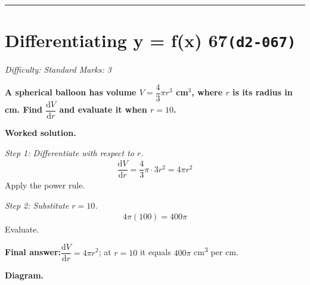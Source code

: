 \documentclass[11pt]{article}
\newcommand{\question}[1]{\par\medskip\noindent\textbf{#1}\par}
\begin{document}
\medskip\hrule

\section*{Differentiating y = f(x) 67\quad\small\texttt{(d2-067)}}
\textit{Difficulty: Standard \quad\textbar\quad Marks: 3}

\question{A spherical balloon has volume \( V = \dfrac{4}{3}\pi r^3 \) cm\( ^3 \), where \( r \) is its radius in cm. Find \( \dfrac{\mathrm{d}V}{\mathrm{d}r} \) and evaluate it when \( r = 10 \).}

\textbf{Worked solution.}

\textit{Step 1: Differentiate with respect to \( r \).}
\[\begin{gathered}
\dfrac{\mathrm{d}V}{\mathrm{d}r} = \dfrac{4}{3}\pi \cdot 3r^2 = 4\pi r^2
\end{gathered}\]
Apply the power rule.

\textit{Step 2: Substitute \( r = 10 \).}
\[\begin{gathered}
4\pi (100) = 400\pi
\end{gathered}\]
Evaluate.

\begin{answerbox}
\textbf{Final answer:}\quad \(\displaystyle  \dfrac{\mathrm{d}V}{\mathrm{d}r} = 4\pi r^2 \); at \(\displaystyle  r = 10 \) it equals \(\displaystyle  400\pi \) cm\textsuperscript{3} per cm.
\end{answerbox}
\textbf{Diagram.}
\end{document}
